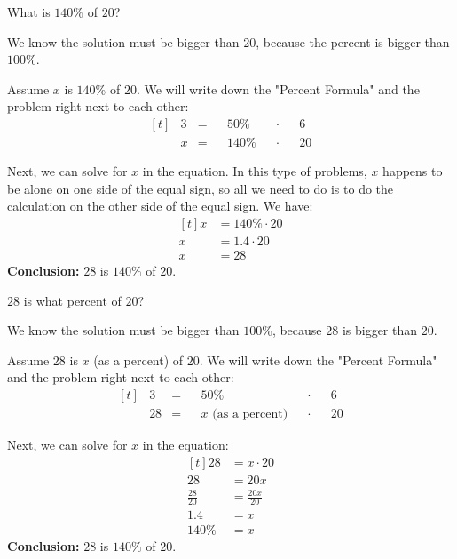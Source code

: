 \begin{myexample}
What is $140\%$ of $20$?
\end{myexample}
\begin{solution}

We know the solution must be bigger than $20$, because the percent is bigger than $100\%$.

Assume $x$ is $140\%$ of $20$. We will write down the "Percent Formula" and the problem right next to each other:
\[
\begin{aligned}[t]
	&3 &= &&50\% &&\cdot &&6 \\
	&x &= &&140\% &&\cdot &&20
\end{aligned}
\]

Next, we can solve for $x$ in the equation. In this type of problems, $x$ happens to be alone on one side of the equal sign, so all we need to do is to do the calculation on the other side of the equal sign. We have:
\[
\begin{aligned}[t]
	x &= 140\% \cdot 20 \\
	x &= 1.4 \cdot 20 \\
	x &= 28
\end{aligned}
\]
\textbf{Conclusion:} $28$ is $140\%$ of $20$.

\end{solution}

\begin{myexample}
$28$ is what percent of $20$?
\end{myexample}
\begin{solution}
We know the solution must be bigger than $100\%$, because $28$ is bigger than $20$.

Assume $28$ is $x$ (as a percent) of $20$. We will write down the "Percent Formula" and the problem right next to each other:
\[
\begin{aligned}[t]
	&3 &= &&50\% &&\cdot &&6 \\
	&28 &= &&x \text{ (as a percent)} &&\cdot &&20
\end{aligned}
\]

Next, we can solve for $x$ in the equation:
\[
\begin{aligned}[t]
	28 &= x \cdot 20 \\
	28 &= 20x \\
	\frac{28}{20} &= \frac{20x}{20} \\
	1.4 &= x \\
	140\% &= x
\end{aligned}
\]
\textbf{Conclusion:} $28$ is $140\%$ of $20$.
\end{solution}

